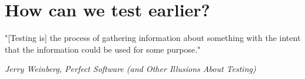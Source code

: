     
    \section*{How can we test earlier?}

    \begin{framed}
       "[Testing is] the process of gathering information about something with the intent that the information could be used for some purpose." 
       
       \begin{flushright}
            \textit{Jerry Weinberg, Perfect Software (and Other Illusions About Testing)}
        \end{flushright}
    \end{framed}    

    
    
\fi